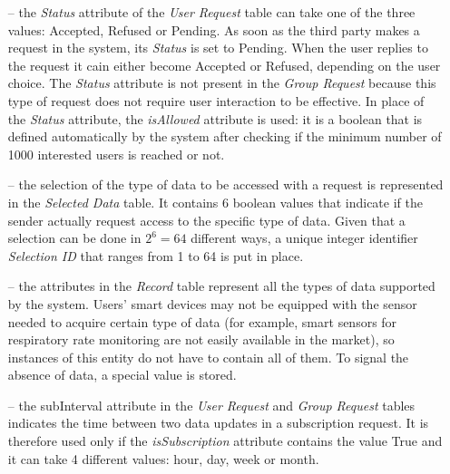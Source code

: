 \begin{itemize}

\item[--] the \textit{Status} attribute of the \textit{User Request} table can take one of the three values: Accepted, Refused or Pending. As soon as the third party makes a request in the system, its \textit{Status} is set to Pending. When the user replies to the request it cain either become Accepted or Refused, depending on the user choice.
The \textit{Status} attribute is not present in the \textit{Group Request} because this type of request does not require user interaction to be effective. In place of the \textit{Status} attribute, the \textit{isAllowed} attribute is used: it is a boolean that is defined automatically by the system after checking if the minimum number of 1000 interested users is reached or not.

\item[--] the selection of the type of data to be accessed with a request is represented in the \textit{Selected Data} table. It contains 6 boolean values that indicate if the sender actually request access to the specific type of data.
Given that a selection can be done in $2^6 = 64$ different ways, a unique integer identifier \textit{Selection ID} that ranges from 1 to 64 is put in place.

\item[--] the attributes in the \textit{Record} table represent all the types of data supported by the system. Users’ smart devices may not be equipped with the sensor needed to acquire certain type of data (for example, smart sensors for respiratory rate monitoring are not easily available in the market), so instances of this entity do not have to contain all of them. To signal the absence of data, a special value is stored. 

\item[--] the subInterval attribute in the \textit{User Request} and \textit{Group Request} tables indicates the time between two data updates in a subscription request. It is therefore used only if the \textit{isSubscription} attribute contains the value True and it can take 4 different values: hour, day, week or month. 

\end{itemize}



